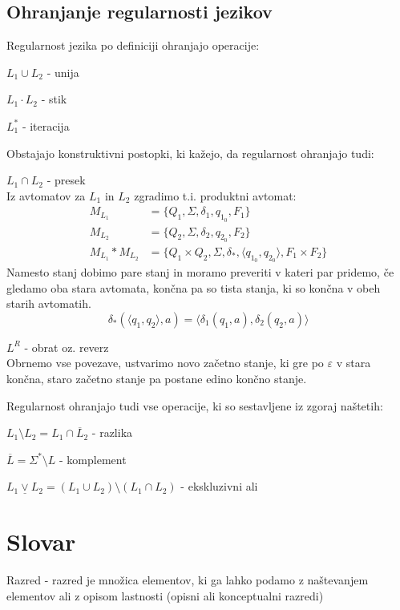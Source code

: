 \documentclass[10pt,a4paper,oneside]{book}
\begin{document}
\section{Ohranjanje regularnosti jezikov}
Regularnost jezika po definiciji ohranjajo operacije:
\begin{items}
\item $L_1 \cup L_2$ - unija 
\item $L_1 \cdot L_2$ - stik 
\item $L_1^*$ - iteracija
\end{items}
Obstajajo konstruktivni postopki, ki kažejo, da regularnost ohranjajo tudi:
\begin{items}
\item $L_1 \cap L_2$ - presek\\
	Iz avtomatov za $L_1$ in $L_2$ zgradimo t.i. produktni avtomat:
		\begin{align*}
			M_{L_1} &= \{ Q_1, \Sigma, \delta_1, q_{1_0}, F_1 \}\\
			M_{L_2} &= \{ Q_2, \Sigma, \delta_2, q_{2_0}, F_2 \}\\
			M_{L_1}*M_{L_2} &= \{ Q_1 \times Q_2, \Sigma, \delta_*, \langle q_{1_0}, q_{2_0} \rangle, F_1 \times F_2 \}
		\end{align*}
	Namesto stanj dobimo pare stanj in moramo preveriti v kateri par pridemo, če gledamo oba stara avtomata, končna pa so tista stanja, ki so končna v obeh starih avtomatih.
	\begin{displaymath}
		\delta_*(\langle q_1, q_2 \rangle, a) = \langle \delta_1(q_1, a), \delta_2(q_2, a)\rangle
	\end{displaymath}
\item $L^R$ - obrat oz. reverz\\
	Obrnemo vse povezave, ustvarimo novo začetno stanje, ki gre po $\varepsilon$ v stara končna, staro začetno stanje pa postane edino končno stanje.
\end{items}
Regularnost ohranjajo tudi vse operacije, ki so sestavljene iz zgoraj naštetih:
\begin{items}
\item $L_1 \setminus L_2 = L_1 \cap \overline L_2$ - razlika
\item $\overline{L} = \Sigma^* \setminus L$ - komplement
\item $L_1 \underline\vee L_2 = (L_1 \cup L_2) \setminus (L_1 \cap L_2)$ - ekskluzivni ali 
\end{items}

\pagebreak

\chapter{Slovar}
\begin{items}
\item Razred - razred je množica elementov, ki ga lahko podamo z naštevanjem elementov ali z opisom lastnosti (opisni ali konceptualni razredi)
\end{items}
\end{document}
